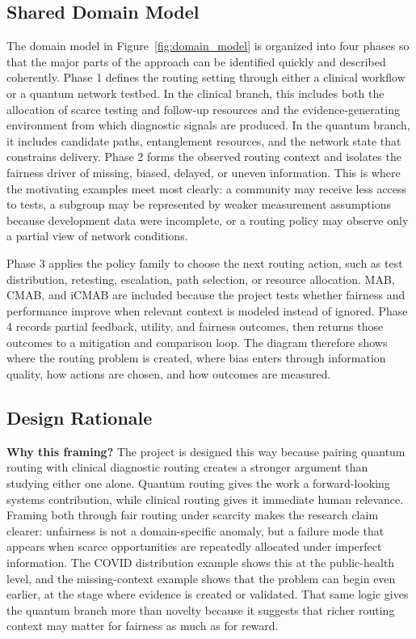\documentclass{IEEEtran}
\begin{document}
\subsection*{Shared Domain Model}
The domain model in Figure~\ref{fig:domain_model} is organized into four phases so that the major parts of the approach can be identified quickly and described coherently. Phase 1 defines the routing setting through either a clinical workflow or a quantum network testbed. In the clinical branch, this includes both the allocation of scarce testing and follow-up resources and the evidence-generating environment from which diagnostic signals are produced. In the quantum branch, it includes candidate paths, entanglement resources, and the network state that constrains delivery. Phase 2 forms the observed routing context and isolates the fairness driver of missing, biased, delayed, or uneven information. This is where the motivating examples meet most clearly: a community may receive less access to tests, a subgroup may be represented by weaker measurement assumptions because development data were incomplete, or a routing policy may observe only a partial view of network conditions.

Phase 3 applies the policy family to choose the next routing action, such as test distribution, retesting, escalation, path selection, or resource allocation. MAB, CMAB, and iCMAB are included because the project tests whether fairness and performance improve when relevant context is modeled instead of ignored. Phase 4 records partial feedback, utility, and fairness outcomes, then returns those outcomes to a mitigation and comparison loop. The diagram therefore shows where the routing problem is created, where bias enters through information quality, how actions are chosen, and how outcomes are measured.

\subsection*{Design Rationale}
\noindent\textbf{Why this framing?} The project is designed this way because pairing quantum routing with clinical diagnostic routing creates a stronger argument than studying either one alone. Quantum routing gives the work a forward-looking systems contribution, while clinical routing gives it immediate human relevance. Framing both through fair routing under scarcity makes the research claim clearer: unfairness is not a domain-specific anomaly, but a failure mode that appears when scarce opportunities are repeatedly allocated under imperfect information. The COVID distribution example shows this at the public-health level, and the missing-context example shows that the problem can begin even earlier, at the stage where evidence is created or validated. That same logic gives the quantum branch more than novelty because it suggests that richer routing context may matter for fairness as much as for reward.
\end{document}
